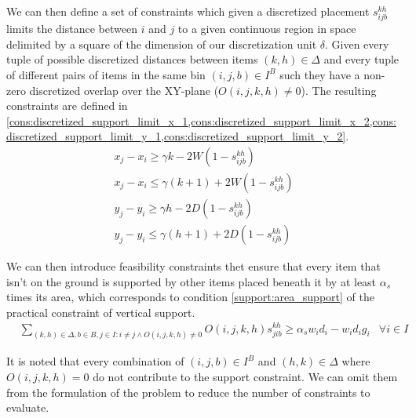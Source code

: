 We can then define a set of constraints which given a discretized placement $s^{k h}_{i j b}$ limits the distance between $i$ and $j$ to a given continuous region in space delimited by a square of the dimension of our discretization unit $\delta$.
Given every tuple of possible discretized distances between items $ (k, h) \in \Delta$ and every tuple of different pairs of items in the same bin $(i, j, b) \in I^B$ such they have a non-zero discretized overlap over the XY-plane ($O(i, j, k, h) \neq 0$).
The resulting constraints are defined in \cref{cons:discretized_support_limit_x_1,cons:discretized_support_limit_x_2,cons:discretized_support_limit_y_1,cons:discretized_support_limit_y_2}.
\begin{align}
    & x_j - x_i \ge \gamma k - 2W( 1 - s^{k h}_{i j b}) &  \label{cons:discretized_support_limit_x_1} \\
    & x_j - x_i \le \gamma (k + 1) + 2W( 1 - s^{k h}_{i j b}) &  \label{cons:discretized_support_limit_x_2} \\
    & y_j - y_i \ge \gamma h - 2D( 1 - s^{k h}_{i j b}) &  \label{cons:discretized_support_limit_y_1} \\
    & y_j - y_i \le \gamma (h + 1) + 2D( 1 - s^{k h}_{i j b}) &  \label{cons:discretized_support_limit_y_2}
\end{align}

We can then introduce feasibility constraints thet ensure that every item that isn't on the ground is supported by other items placed beneath it by at least $\alpha_s$ times its area, which corresponds to condition \ref{support:area_support} of the practical constraint of vertical support.
\begin{eqnarray}
    & \sum\limits_{(k, h) \in \Delta, b \in B, j \in I : i \neq j \land O(i, j, k, h) \neq 0}{ O(i, j, k, h)s^{k h}_{j i b}} \ge \alpha_s w_i d_i - w_i d_i g_i & \forall i \in I \label{cons:every_item_is_supported}
\end{eqnarray}

It is noted that every combination of $(i,j,b) \in I^B$ and $(h,k) \in \Delta$ where $O(i, j, k, h) = 0$ do not contribute to the support constraint. We can omit them from the formulation of the problem to reduce the number of constraints to evaluate.